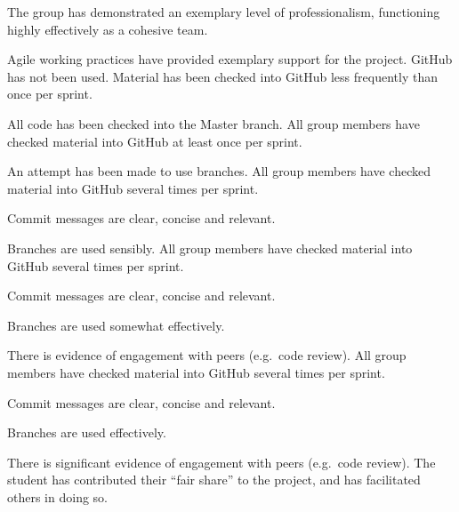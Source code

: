 \documentclass{../fal_assignment}
\begin{document}
\begin{markingrubric}
        \grade The group has demonstrated an exemplary level of professionalism,
            functioning highly effectively as a cohesive team.
            \par Agile working practices have provided exemplary support for the project.
        \grade\fail GitHub has not been used.
        \grade Material has been checked into GitHub less frequently than once per sprint.
            \par All code has been checked into the Master branch.
        \grade All group members have checked material into GitHub at least once per sprint.
            \par An attempt has been made to use branches.
        \grade All group members have checked material into GitHub several times per sprint.
            \par Commit messages are clear, concise and relevant.
            \par Branches are used sensibly.
        \grade All group members have checked material into GitHub several times per sprint.
            \par Commit messages are clear, concise and relevant.
            \par Branches are used somewhat effectively.
            \par There is evidence of engagement with peers (e.g.\ code review).
        \grade All group members have checked material into GitHub several times per sprint.
            \par Commit messages are clear, concise and relevant.
            \par Branches are used effectively.
            \par There is significant evidence of engagement with peers (e.g.\ code review).
        \grade The student has contributed their ``fair share'' to the project,
            and has facilitated others in doing so.
\end{markingrubric}
\end{document}
